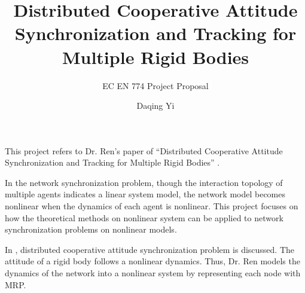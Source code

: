 \documentclass{llncs}
\begin{document}
\title{Distributed Cooperative Attitude Synchronization and Tracking for Multiple Rigid Bodies}


\subtitle{EC EN 774 Project Proposal}


\author{Daqing Yi}







\maketitle


This project refers to Dr. Ren's paper of ``Distributed Cooperative Attitude Synchronization and Tracking for Multiple Rigid Bodies'' \cite{5229134}.

In the network synchronization problem, though the interaction topology of multiple agents indicates a linear system model, the network model becomes nonlinear when the dynamics of each agent is nonlinear.
This project focuses on how the theoretical methods on nonlinear system can be applied to network synchronization problems on nonlinear models.

In \cite{5229134}, distributed cooperative attitude synchronization problem is discussed.
The attitude of a rigid body follows a nonlinear dynamics.
Thus, Dr. Ren models the dynamics of the network into a nonlinear system by representing each node with MRP.
\end{document}
